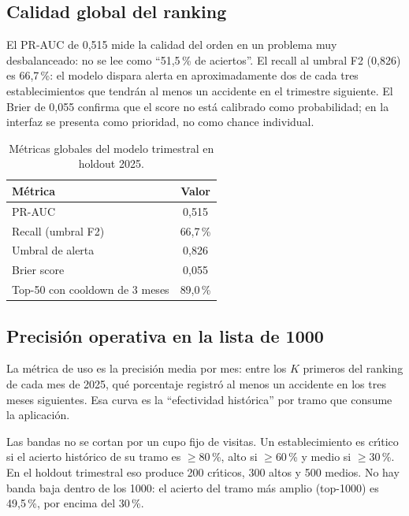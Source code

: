 \subsection*{Calidad global del ranking}

El PR-AUC de 0,515 mide la calidad del orden en un problema muy desbalanceado: no se lee como ``51,5\,\% de aciertos''.
El recall al umbral F2 (0,826) es 66,7\,\%: el modelo dispara alerta en aproximadamente dos de cada tres establecimientos que tendr\'an al menos un accidente en el trimestre siguiente.
El Brier de 0,055 confirma que el score no est\'a calibrado como probabilidad; en la interfaz se presenta como prioridad, no como chance individual.

\begin{table}[htbp]
	\centering
	\caption{M\'etricas globales del modelo trimestral en holdout 2025. \fuentepropia}
	\label{tab:metricas-holdout}
	\begin{tabular}{@{}lc@{}}
		\hline
		\textbf{M\'etrica} & \textbf{Valor} \\
		\hline
		PR-AUC & 0,515 \\
		Recall (umbral F2) & 66,7\,\% \\
		Umbral de alerta & 0,826 \\
		Brier score & 0,055 \\
		Top-50 con cooldown de 3 meses & 89,0\,\% \\
		\hline
	\end{tabular}
\end{table}

\subsection*{Precisi\'on operativa en la lista de 1000}

La m\'etrica de uso es la precisi\'on media por mes: entre los $K$ primeros del ranking de cada mes de 2025, qu\'e porcentaje registr\'o al menos un accidente en los tres meses siguientes.
Esa curva es la ``efectividad hist\'orica'' por tramo que consume la aplicaci\'on.

Las bandas no se cortan por un cupo fijo de visitas.
Un establecimiento es cr\'{\i}tico si el acierto hist\'orico de su tramo es $\geq 80$\,\%, alto si $\geq 60$\,\% y medio si $\geq 30$\,\%.
En el holdout trimestral eso produce 200 cr\'{\i}ticos, 300 altos y 500 medios.
No hay banda baja dentro de los 1000: el acierto del tramo m\'as amplio (top-1000) es 49,5\,\%, por encima del 30\,\%.

